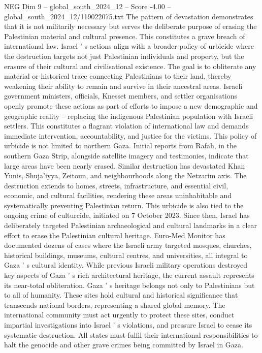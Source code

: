 \begin{textsample}{NEG Dim 9 – global\_south\_2024\_12 – Score -4.00 – global\_south\_2024\_12/119022075.txt}
The pattern of devastation demonstrates that it is not militarily necessary but serves the deliberate purpose of erasing the Palestinian material and cultural presence.
This constitutes a grave breach of international law.
Israel ' s actions align with a broader policy of urbicide where the destruction targets not just Palestinian individuals and property, but the erasure of their cultural and civilisational existence.
The goal is to obliterate any material or historical trace connecting Palestinians to their land, thereby weakening their ability to remain and survive in their ancestral areas.
Israeli government ministers, officials, Knesset members, and settler organisations openly promote these actions as part of efforts to impose a new demographic and geographic reality -- replacing the indigenous Palestinian population with Israeli settlers.
This constitutes a flagrant violation of international law and demands immediate intervention, accountability, and justice for the victims.
This policy of urbicide is not limited to northern Gaza.
Initial reports from Rafah, in the southern Gaza Strip, alongside satellite imagery and testimonies, indicate that large areas have been nearly erased.
Similar destruction has devastated Khan Yunis, Shuja'iyya, Zeitoun, and neighbourhoods along the Netzarim axis.
The destruction extends to homes, streets, infrastructure, and essential civil, economic, and cultural facilities, rendering these areas uninhabitable and systematically preventing Palestinian return.
This urbicide is also tied to the ongoing crime of culturcide, initiated on 7 October 2023.
Since then, Israel has deliberately targeted Palestinian archaeological and cultural landmarks in a clear effort to erase the Palestinian cultural heritage.
Euro-Med Monitor has documented dozens of cases where the Israeli army targeted mosques, churches, historical buildings, museums, cultural centres, and universities, all integral to Gaza ' s cultural identity.
While previous Israeli military operations destroyed key aspects of Gaza ' s rich architectural heritage, the current assault represents its near-total obliteration.
Gaza ' s heritage belongs not only to Palestinians but to all of humanity.
These sites hold cultural and historical significance that transcends national borders, representing a shared global memory.
The international community must act urgently to protect these sites, conduct impartial investigations into Israel ' s violations, and pressure Israel to cease its systematic destruction.
All states must fulfil their international responsibilities to halt the genocide and other grave crimes being committed by Israel in Gaza.

\end{textsample}
